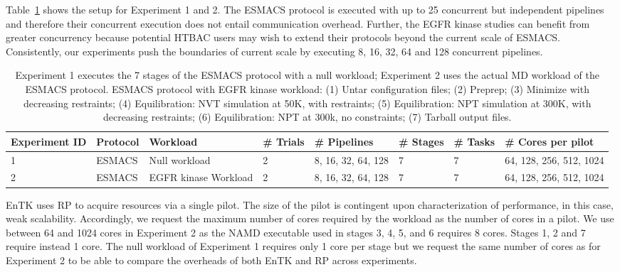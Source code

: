 \documentclass[conference]{IEEEtran}
\begin{document}
Table~\ref{tab:exp} shows the setup for Experiment 1 and 2. The ESMACS
protocol is executed with up to 25 concurrent but independent pipelines and
therefore their concurrent execution does not entail communication overhead.
Further, the EGFR kinase studies can benefit from greater concurrency because
potential HTBAC users may wish to extend their protocols beyond the current
scale of ESMACS\@. Consistently, our experiments push the boundaries of
current scale by executing 8, 16, 32, 64 and 128 concurrent pipelines.

\begin{table}[t]
\centering
\caption{Experiment 1 executes the 7 stages of the ESMACS protocol with
a null workload; Experiment 2 uses the actual MD workload of the ESMACS
protocol. ESMACS protocol with EGFR kinase workload: (1) Untar configuration
files; (2) Preprep; (3) Minimize with decreasing restraints; (4)
Equilibration: NVT simulation at 50K, with restraints; (5) Equilibration: NPT
simulation at 300K, with decreasing restraints; (6) Equilibration: NPT at
300k, no constraints; (7) Tarball output files.}\label{tab:exp}
\begin{tabular}{llllllll}
\toprule
\textbf{Experiment ID}      &
\textbf{Protocol}           &
\textbf{Workload}           &
\textbf{\# Trials}          &
\textbf{\# Pipelines}       &
\textbf{\# Stages}          &
\textbf{\# Tasks}           &
\textbf{\# Cores per pilot} \\
\toprule
%
1                           &
ESMACS                      &
Null workload               &
2                           &
8, 16, 32, 64, 128          &
7                           &
7                           &
64, 128, 256, 512, 1024     \\
%
2                           &
ESMACS                      &
EGFR kinase Workload        &
2                           &
8, 16, 32, 64, 128          &
7                           &
7                           &
64, 128, 256, 512, 1024     \\
\bottomrule
\end{tabular}
\end{table}

EnTK uses RP to acquire resources via a single pilot. The size of the pilot is
contingent upon characterization of performance, in this case, weak
scalability. Accordingly, we request the maximum number of cores required by
the workload as the number of cores in a pilot. We use between 64 and 1024
cores in Experiment 2 as the NAMD executable used in stages 3, 4, 5, and 6
requires 8 cores. Stages 1, 2 and 7 require instead 1 core. The null workload
of Experiment 1 requires only 1 core per stage but we request the same number
of cores as for Experiment 2 to be able to compare the overheads of both EnTK
and RP across experiments.
\end{document}
